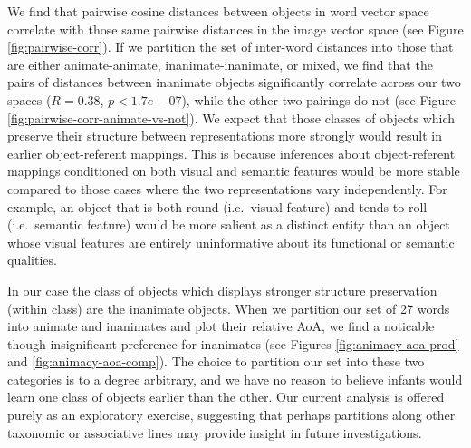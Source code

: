 \documentclass[10pt, letterpaper]{article}
\begin{document}
We find that pairwise cosine distances between objects in word vector
space correlate with those same pairwise distances in the image vector
space (see Figure \ref{fig:pairwise-corr}). If we partition the set of
inter-word distances into those that are either animate-animate,
inanimate-inanimate, or mixed, we find that the pairs of distances
between inanimate objects significantly correlate across our two spaces
(\(R = 0.38\), \(p < 1.7e-07\)), while the other two pairings do not
(see Figure \ref{fig:pairwise-corr-animate-vs-not}). We expect that
those classes of objects which preserve their structure between
representations more strongly would result in earlier object-referent
mappings. This is because inferences about object-referent mappings
conditioned on both visual and semantic features would be more stable
compared to those cases where the two representations vary
independently. For example, an object that is both round (i.e.~visual
feature) and tends to roll (i.e.~semantic feature) would be more salient
as a distinct entity than an object whose visual features are entirely
uninformative about its functional or semantic qualities.

In our case the class of objects which displays stronger structure
preservation (within class) are the inanimate objects. When we partition
our set of 27 words into animate and inanimates and plot their relative
AoA, we find a noticable though insignificant preference for inanimates
(see Figures \ref{fig:animacy-aoa-prod} and \ref{fig:animacy-aoa-comp}).
The choice to partition our set into these two categories is to a degree
arbitrary, and we have no reason to believe infants would learn one
class of objects earlier than the other. Our current analysis is offered
purely as an exploratory exercise, suggesting that perhaps partitions
along other taxonomic or associative lines may provide insight in future
investigations.
\end{document}
